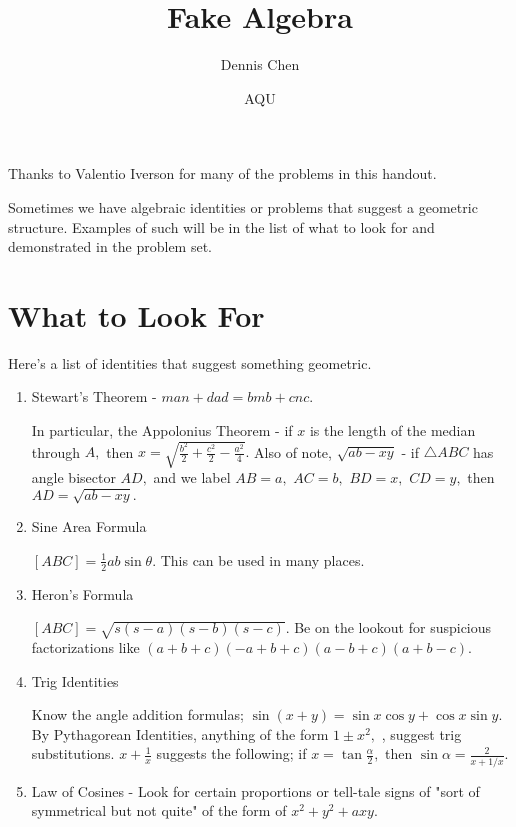 \documentclass{article}
\title{Fake Algebra}
\author{Dennis Chen}
\date{AQU}
\begin{document}
\maketitle
Thanks to Valentio Iverson for many of the problems in this handout.

Sometimes we have algebraic identities or problems that suggest a geometric structure. Examples of such will be in the list of what to look for and demonstrated in the problem set.

\section{What to Look For}
Here's a list of identities that suggest something geometric.
\begin{enumerate}
    \item Stewart's Theorem - $man+dad=bmb+cnc.$
    \begin{itemize}
    \Item In particular, the Appolonius Theorem - if $x$ is the length of the median through $A,$ then $x=\sqrt{\frac{b^2}{2}+\frac{c^2}{2}-\frac{a^2}{4}}.$
    \Item Also of note, $\sqrt{ab-xy}$ - if $\triangle ABC$ has angle bisector $AD,$ and we label $AB=a,$ $AC=b,$ $BD=x,$ $CD=y,$ then $AD=\sqrt{ab-xy}.$
    \end{itemize}
    \item Sine Area Formula
	\begin{itemize}
	\Item $[ABC]=\frac{1}{2}ab\sin \theta.$ This can be used in many places.
	\end{itemize}
    \item Heron's Formula
    \begin{itemize}
    \Item $[ABC]=\sqrt{s(s-a)(s-b)(s-c)}.$ Be on the lookout for suspicious factorizations like $(a+b+c)(-a+b+c)(a-b+c)(a+b-c).$
    \end{itemize}
    \item Trig Identities
    \begin{itemize}
	\Item Know the angle addition formulas; $\sin(x+y)=\sin x\cos y+\cos x\sin y.$
	\Item By Pythagorean Identities, anything of the form $1\pm x^2,$ , suggest trig substitutions.
    \Item $x+\frac{1}{x}$ suggests the following; if $x=\tan\frac{\alpha}{2},$ then $\sin \alpha = \frac{2}{x+1/x}.$
    \end{itemize}
    \item Law of Cosines - Look for certain proportions or tell-tale signs of "sort of symmetrical but not quite" of the form of $x^2+y^2+axy.$ 
\end{enumerate}
\end{document}
